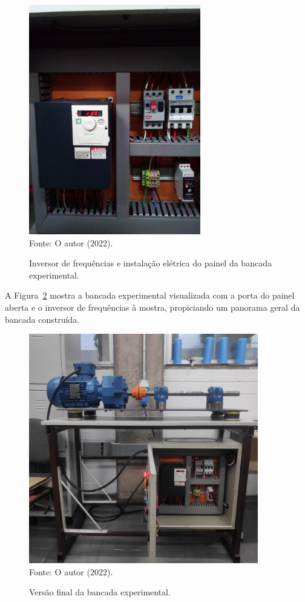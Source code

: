 \documentclass[
	12pt,				
	oneside,			
	a4paper,			
	english,			
	brazil,	
	sumario=abnt-6027-2012		
	]{abntex2ppgsi}
\begin{document}
\begin{figure}[H]
\centering
\caption {Inversor de frequências e instalação elétrica do painel da bancada experimental.}
\includegraphics[width=\textwidth,height=100mm,keepaspectratio,angle=-90]{painel_por_dentro} \\
Fonte: O autor (2022).
\label{painel_por_dentro}
\end{figure}

A Figura~\ref{bancada_aberta} mostra a bancada experimental visualizada com a porta do painel aberta e o inversor de frequências à mostra, propiciando um panorama geral da bancada construída.
 
\begin{figure}[H]
\centering
\caption {Versão final da bancada experimental.}
\includegraphics[width=\textwidth,height=100mm,keepaspectratio]{bancada_aberta} \\
Fonte: O autor (2022).
\label{bancada_aberta}
\end{figure}
  
\end{document}
